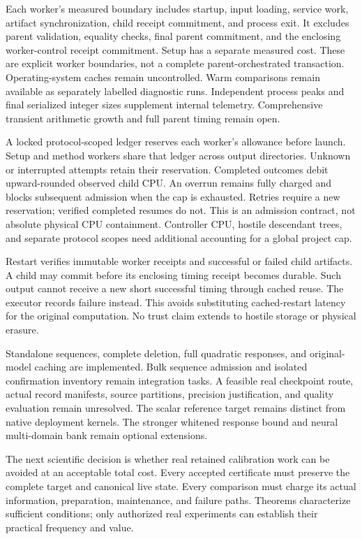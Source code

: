 Each worker's measured boundary includes startup, input loading, service work, artifact synchronization, child receipt commitment, and process exit.
It excludes parent validation, equality checks, final parent commitment, and the enclosing worker-control receipt commitment.
Setup has a separate measured cost.
These are explicit worker boundaries, not a complete parent-orchestrated transaction.
Operating-system caches remain uncontrolled.
Warm comparisons remain available as separately labelled diagnostic runs.
Independent process peaks and final serialized integer sizes supplement internal telemetry.
Comprehensive transient arithmetic growth and full parent timing remain open.

A locked protocol-scoped ledger reserves each worker's allowance before launch.
Setup and method workers share that ledger across output directories.
Unknown or interrupted attempts retain their reservation.
Completed outcomes debit upward-rounded observed child CPU.
An overrun remains fully charged and blocks subsequent admission when the cap is exhausted.
Retries require a new reservation; verified completed resumes do not.
This is an admission contract, not absolute physical CPU containment.
Controller CPU, hostile descendant trees, and separate protocol scopes need additional accounting for a global project cap.

Restart verifies immutable worker receipts and successful or failed child artifacts.
A child may commit before its enclosing timing receipt becomes durable.
Such output cannot receive a new short successful timing through cached reuse.
The executor records failure instead.
This avoids substituting cached-restart latency for the original computation.
No trust claim extends to hostile storage or physical erasure.

Standalone sequences, complete deletion, full quadratic responses, and original-model caching are implemented.
Bulk sequence admission and isolated confirmation inventory remain integration tasks.
A feasible real checkpoint route, actual record manifests, source partitions, precision justification, and quality evaluation remain unresolved.
The scalar reference target remains distinct from native deployment kernels.
The stronger whitened response bound and neural multi-domain bank remain optional extensions.

The next scientific decision is whether real retained calibration work can be avoided at an acceptable total cost.
Every accepted certificate must preserve the complete target and canonical live state.
Every comparison must charge its actual information, preparation, maintenance, and failure paths.
Theorems characterize sufficient conditions; only authorized real experiments can establish their practical frequency and value.
